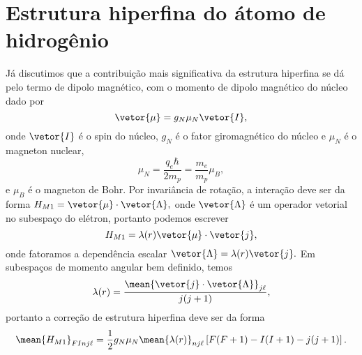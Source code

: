 \section{Estrutura hiperfina do átomo de hidrogênio}
Já discutimos que a contribuição mais significativa da estrutura hiperfina se dá pelo termo de dipolo magnético, com o momento de dipolo magnético do núcleo dado por
\begin{equation*}
   \vetor{\mu} = g_N \mu_N \vetor{I},
\end{equation*}
onde \(\vetor{I}\) é o spin do núcleo, \(g_N\) é o fator giromagnético do núcleo e \(\mu_N\) é o magneton nuclear,
\begin{equation*}
   \mu_N = \frac{q_e \hbar}{2m_p} = \frac{m_e}{m_p}\mu_B,
\end{equation*}
e \(\mu_B\) é o magneton de Bohr. Por invariância de rotação, a interação deve ser da forma \(H_{M1} = \vetor{\mu} \cdot \vetor{\Lambda},\) onde \(\vetor{\Lambda}\) é um operador vetorial no subespaço do elétron, portanto podemos escrever
\begin{equation*}
   H_{M1} = \lambda(r) \vetor{\mu} \cdot \vetor{j},
\end{equation*}
onde fatoramos a dependência escalar \(\vetor{\Lambda} = \lambda(r)\vetor{j}.\) Em subespaços de momento angular bem definido, temos
\begin{equation*}
   \lambda(r) = \frac{\mean{\vetor{j} \cdot \vetor{\Lambda}}_{j\ell}}{j (j + 1)},
\end{equation*}
portanto a correção de estrutura hiperfina deve ser da forma
\begin{equation*}
   \mean{H_{M1}}_{FInj\ell} = \frac12 g_N \mu_N \mean{\lambda(r)}_{nj\ell} \left[F(F+1) - I(I + 1) - j(j+1)\right].
\end{equation*}

